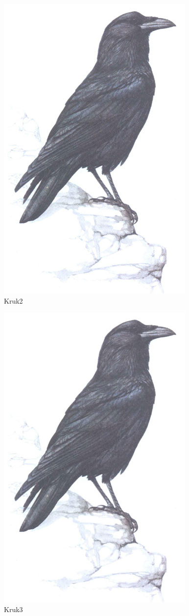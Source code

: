\documentclass[a4paper,10pt]{report}
\begin{document}
\begin{figure}[ht]
\centerline{\includegraphics[scale=0.2]{kruk}}
\caption{Kruk2}
\end{figure}

\begin{figure}[ht]
\centerline{\includegraphics[scale=0.2]{kruk}}
\caption{Kruk3}
\end{figure}
\end{document}
